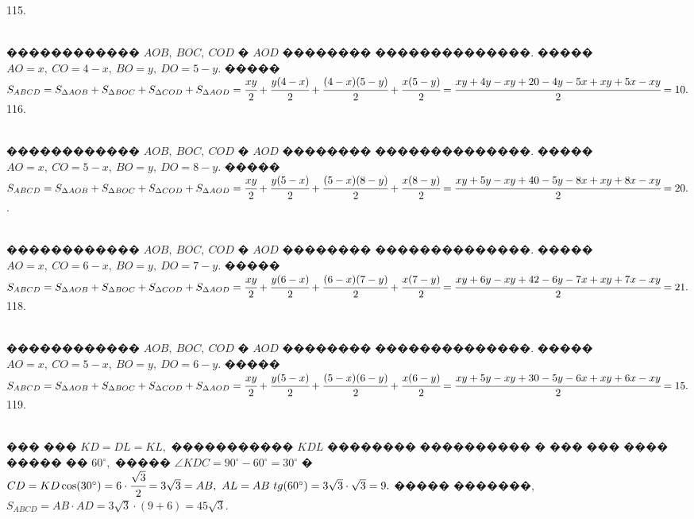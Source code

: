 \documentclass[12pt]{article}
\begin{document}
115. \begin{figure}[ht!]
\end{figure}\\
������������ $AOB,\ BOC,\ COD$ � $AOD$ �������� ��������������. ����� $AO=x,\ CO=4-x,\ BO=y,\ DO=5-y.$ ����� $S_{ABCD}=S_{\Delta AOB}+S_{\Delta BOC}+S_{\Delta COD}+S_{\Delta AOD}=\cfrac{xy}{2}+\cfrac{y(4-x)}{2}+\cfrac{(4-x)(5-y)}{2}+\cfrac{x(5-y)}{2}=\cfrac{xy+4y-xy+20-4y-5x+xy+5x-xy}{2}=10.$\\
116. \begin{figure}[ht!]
\end{figure}\\
������������ $AOB,\ BOC,\ COD$ � $AOD$ �������� ��������������. ����� $AO=x,\ CO=5-x,\ BO=y,\ DO=8-y.$ ����� $S_{ABCD}=S_{\Delta AOB}+S_{\Delta BOC}+S_{\Delta COD}+S_{\Delta AOD}=\cfrac{xy}{2}+\cfrac{y(5-x)}{2}+\cfrac{(5-x)(8-y)}{2}+\cfrac{x(8-y)}{2}=\cfrac{xy+5y-xy+40-5y-8x+xy+8x-xy}{2}=20.$\newpage{}. \begin{figure}[ht!]
\end{figure}\\
������������ $AOB,\ BOC,\ COD$ � $AOD$ �������� ��������������. ����� $AO=x,\ CO=6-x,\ BO=y,\ DO=7-y.$ ����� $S_{ABCD}=S_{\Delta AOB}+S_{\Delta BOC}+S_{\Delta COD}+S_{\Delta AOD}=\cfrac{xy}{2}+\cfrac{y(6-x)}{2}+\cfrac{(6-x)(7-y)}{2}+\cfrac{x(7-y)}{2}=\cfrac{xy+6y-xy+42-6y-7x+xy+7x-xy}{2}=21.$\\
118. \begin{figure}[ht!]
\end{figure}\\
������������ $AOB,\ BOC,\ COD$ � $AOD$ �������� ��������������. ����� $AO=x,\ CO=5-x,\ BO=y,\ DO=6-y.$ ����� $S_{ABCD}=S_{\Delta AOB}+S_{\Delta BOC}+S_{\Delta COD}+S_{\Delta AOD}=\cfrac{xy}{2}+\cfrac{y(5-x)}{2}+\cfrac{(5-x)(6-y)}{2}+\cfrac{x(6-y)}{2}=\cfrac{xy+5y-xy+30-5y-6x+xy+6x-xy}{2}=15.$\\
119. \begin{figure}[ht!]
\end{figure}\\
��� ��� $KD=DL=KL,$ ����������� $KDL$ �������� ���������� � ��� ��� ���� ����� �� $60^\circ,$ ����� $\angle KDC=90^\circ-60^\circ=30^\circ$ � $CD=KD\cos(30^\circ)=6\cdot\cfrac{\sqrt{3}}{2}=3\sqrt{3}=AB,\ AL=AB\ tg(60^\circ)=3\sqrt{3}\cdot\sqrt{3}=9.$ ����� �������, $S_{ABCD}=AB\cdot AD=3\sqrt{3}\cdot(9+6)=45\sqrt{3}.$\\
\end{document}

